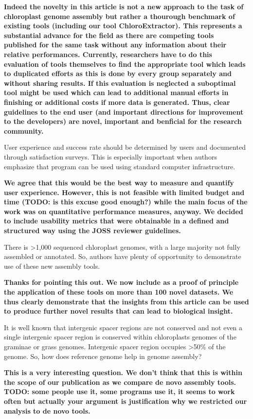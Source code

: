 \documentclass[a4paper,10pt]{scrartcl}
\begin{document}
\textbf{
Indeed the novelty in this article is not a new approach to the task of chloroplast genome assembly but rather a thourough benchmark of existing tools (including our tool ChloroExtractor).
This represents a substantial advance for the field as there are competing tools published for the same task without any information about their relative performances.
Currently, researchers have to do this evaluation of tools themselves to find the appropriate tool which leads to duplicated efforts as this is done by every group separately and without sharing results.
If this evaluation is neglected a suboptimal tool might be used which can lead to additional manual efforts in finishing or additional costs if more data is generated.
Thus, clear guidelines to the end user (and important directions for improvement to the developers) are novel, important and benficial for the research community.
}

User experience and success rate should be determined by users and documented through satisfaction surveys.
This is especially important when authors emphasize that program can be used using standard computer infrastructure.

\textbf{
We agree that this would be the best way to measure and quantify user experience.
However, this is not feasible with limited budget and time (TODO: is this excuse good enough?) while the main focus of the work was on quantitative performance measures, anyway.
We decided to include usability metrics that were obtainable in a defined and structured way using the JOSS reviewer guidelines.
}

There is >1,000 sequenced chloroplast genomes, with a large majority not fully assembled or annotated.
So, authors have plenty of opportunity to demonstrate use of these new assembly tools.

\textbf{
Thanks for pointing this out.
We now include as a proof of principle the application of these tools on more than 100 novel datasets.
We thus clearly demonstrate that the insights from this article can be used to produce further novel results that can lead to biological insight.
}

It is well known that intergenic spacer regions are not conserved and not even a single intergenic spacer region is conserved within chloroplasts genomes of the graminae or grass genomes.
Intergenic spacer region occupies >50\% of the genome.
So, how does reference genome help in genome assembly?

\textbf{
This is a very interesting question.
We don't think that this is within the scope of our publication as we compare de novo assembly tools.
TODO: some people use it, some programs use it, it seems to work often but actually your argument is justification why we restricted our analysis to de novo tools.
}
\end{document}
